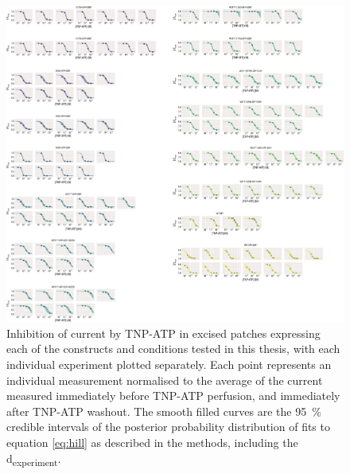 \begin{figure}[h]
	\centering
	\includegraphics[width=\textwidth]{all_tnpatp_fits_2.pdf}
	\caption[TNP-ATP inhibition sample hill fits]{
	{\bf{}}
	Inhibition of current by TNP-ATP in excised patches expressing each of the constructs and conditions tested in this thesis, with each individual experiment plotted separately.
	Each point represents an individual measurement normalised to the average of the current measured immediately before TNP-ATP perfusion, and immediately after TNP-ATP washout.
	The smooth filled curves are the \SI{95}{\percent} credible intervals of the posterior probability distribution of fits to equation \ref{eq:hill} as described in the methods, including the \textgreek{d}\textsubscript{experiment}.
	}
	\label{apxfig:tnpatp_inhib_2}
\end{figure}

